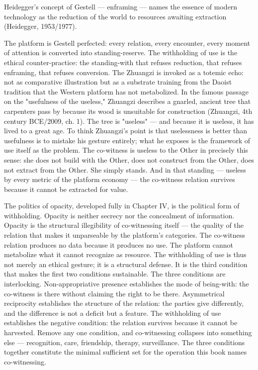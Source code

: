 Heidegger's concept of Gestell — enframing — names the essence of modern technology as the reduction of the world to resources awaiting extraction (Heidegger, 1953/1977).

The platform is Gestell perfected: every relation, every encounter, every moment of attention is converted into standing-reserve. The withholding of use is the ethical counter-practice: the standing-with that refuses reduction, that refuses enframing, that refuses conversion. The Zhuangzi is invoked as a totemic echo: not as comparative illustration but as a substrate training from the Daoist tradition that the Western platform has not metabolized. In the famous passage on the "usefulness of the useless," Zhuangzi describes a gnarled, ancient tree that carpenters pass by because its wood is unsuitable for construction (Zhuangzi, 4th century BCE/2009, ch. 1). The tree is "useless" — and because it is useless, it has lived to a great age. To think Zhuangzi's point is that uselessness is better than usefulness is to mistake his gesture entirely; what he exposes is the framework of use itself as the problem. The co-witness is useless to the Other in precisely this sense: she does not build with the Other, does not construct from the Other, does not extract from the Other. She simply stands. And in that standing — useless by every metric of the platform economy — the co-witness relation survives because it cannot be extracted for value.

The politics of opacity, developed fully in Chapter IV, is the political form of withholding. Opacity is neither secrecy nor the concealment of information. Opacity is the structural illegibility of co-witnessing itself — the quality of the relation that makes it unparseable by the platform's categories. The co-witness relation produces no data because it produces no use. The platform cannot metabolize what it cannot recognize as resource. The withholding of use is thus not merely an ethical gesture; it is a structural defense. It is the third condition that makes the first two conditions sustainable. The three conditions are interlocking. Non-appropriative presence establishes the mode of being-with: the co-witness is there without claiming the right to be there. Asymmetrical reciprocity establishes the structure of the relation: the parties give differently, and the difference is not a deficit but a feature. The withholding of use establishes the negative condition: the relation survives because it cannot be harvested. Remove any one condition, and co-witnessing collapses into something else — recognition, care, friendship, therapy, surveillance. The three conditions together constitute the minimal sufficient set for the operation this book names co-witnessing.

